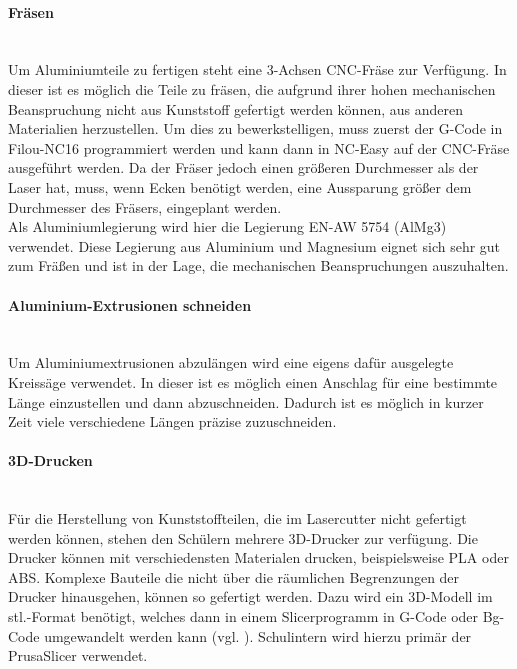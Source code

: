 \paragraph{Fräsen}\mbox{}\\
Um Aluminiumteile zu fertigen steht eine 3-Achsen CNC-Fräse zur Verfügung. In dieser ist es möglich die Teile zu fräsen, die aufgrund ihrer hohen mechanischen Beanspruchung nicht aus Kunststoff gefertigt werden können, aus anderen Materialien herzustellen. Um dies zu bewerkstelligen, muss zuerst der G-Code in Filou-NC16 programmiert werden und kann dann in NC-Easy auf der CNC-Fräse ausgeführt werden. Da der Fräser jedoch einen größeren Durchmesser als der Laser hat, muss, wenn Ecken benötigt werden, eine Aussparung größer dem Durchmesser des Fräsers, eingeplant werden.\\
Als Aluminiumlegierung wird hier die Legierung EN-AW 5754 (AlMg3) verwendet. Diese Legierung aus Aluminium und Magnesium eignet sich sehr gut zum Fräßen und ist in der Lage, die mechanischen Beanspruchungen auszuhalten.

\paragraph{Aluminium-Extrusionen schneiden}\mbox{}\\
Um Aluminiumextrusionen abzulängen wird eine eigens dafür ausgelegte Kreissäge verwendet. In dieser ist es möglich einen Anschlag für eine bestimmte Länge einzustellen und dann abzuschneiden. Dadurch ist es möglich in kurzer Zeit viele verschiedene Längen präzise zuzuschneiden. 

\paragraph{3D-Drucken}\mbox{}\\
Für die Herstellung von Kunststoffteilen, die im Lasercutter nicht gefertigt werden können, stehen den Schülern mehrere 3D-Drucker zur verfügung. Die Drucker können mit verschiedensten Materialen drucken, beispielsweise PLA oder ABS. Komplexe Bauteile die nicht über die räumlichen Begrenzungen der Drucker hinausgehen, können so gefertigt werden. Dazu wird ein 3D-Modell im stl.-Format benötigt, welches dann in einem Slicerprogramm in G-Code oder Bg-Code umgewandelt werden kann (vgl. \cite{How_to_PrusaSlicer}). Schulintern wird hierzu primär der PrusaSlicer verwendet.

